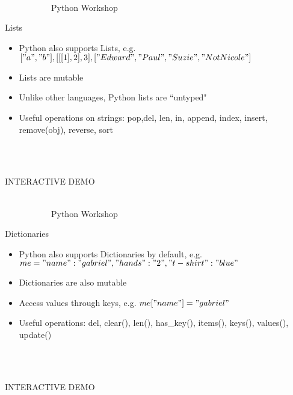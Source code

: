 \documentclass[10pt, xcolor=dvisnames]{beamer}
\begin{document}
\begin{frame}{{\tiny \ \\\vspace{-13pt} \ \ \ \ \ \ \ \ \ \ \ Python Workshop}\\ \centerline{Lists}}
\vspace*{-50pt}

\begin{itemize}
\item Python also supports Lists, e.g. $ ["a", "b"], [[[1],2],3], ["Edward", "Paul", "Suzie", "Not Nicole"]$
\item Lists are mutable
\item Unlike other languages, Python lists are ``untyped"
\item Useful operations on strings: pop,del, len, in, append, index, insert, remove(obj), reverse, sort
\end{itemize}




\ \\
\ \\
\centerline{INTERACTIVE DEMO}

\end{frame}








\begin{frame}{{\tiny \ \\\vspace{-13pt} \ \ \ \ \ \ \ \ \ \ \ Python Workshop}\\ \centerline{Dictionaries}}
\vspace*{-50pt}

\begin{itemize}
\item Python also supports Dictionaries by default, e.g. $me = {"name":"gabriel", "hands": "2", "t-shirt":"blue"} $
\item Dictionaries are also mutable
\item Access values through keys, e.g. $me["name"] = "gabriel"$
\item Useful operations: del, clear(), len(), has\_key(), items(), keys(), values(), update()
\end{itemize}


\ \\
\ \\
\centerline{INTERACTIVE DEMO}


\end{frame}
\end{document}
